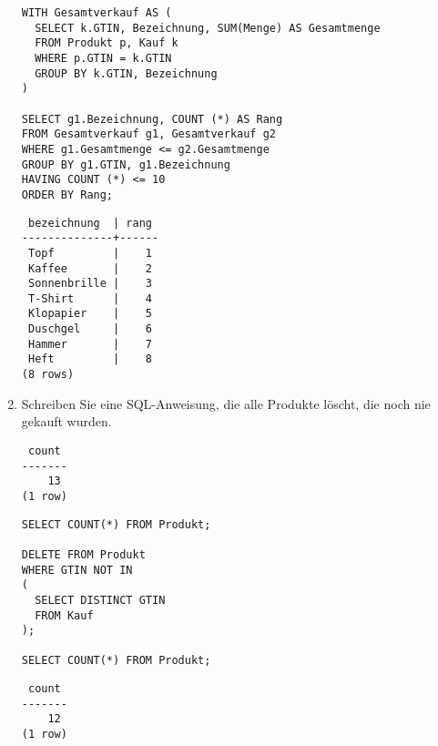 \documentclass{bschlangaul-aufgabe}
\begin{document}
\begin{enumerate}
\begin{bAntwort}
\begin{verbatim}
WITH Gesamtverkauf AS (
  SELECT k.GTIN, Bezeichnung, SUM(Menge) AS Gesamtmenge
  FROM Produkt p, Kauf k
  WHERE p.GTIN = k.GTIN
  GROUP BY k.GTIN, Bezeichnung
)

SELECT g1.Bezeichnung, COUNT (*) AS Rang
FROM Gesamtverkauf g1, Gesamtverkauf g2
WHERE g1.Gesamtmenge <= g2.Gesamtmenge
GROUP BY g1.GTIN, g1.Bezeichnung
HAVING COUNT (*) <= 10
ORDER BY Rang;
\end{verbatim}

\begin{verbatim}
 bezeichnung  | rang
--------------+------
 Topf         |    1
 Kaffee       |    2
 Sonnenbrille |    3
 T-Shirt      |    4
 Klopapier    |    5
 Duschgel     |    6
 Hammer       |    7
 Heft         |    8
(8 rows)
\end{verbatim}
\end{bAntwort}


\item Schreiben Sie eine SQL-Anweisung, die alle Produkte löscht, die
noch nie gekauft wurden.

\begin{bAntwort}
\begin{verbatim}
 count
-------
    13
(1 row)
\end{verbatim}

\begin{verbatim}
SELECT COUNT(*) FROM Produkt;

DELETE FROM Produkt
WHERE GTIN NOT IN
(
  SELECT DISTINCT GTIN
  FROM Kauf
);

SELECT COUNT(*) FROM Produkt;
\end{verbatim}

\begin{verbatim}
 count
-------
    12
(1 row)
\end{verbatim}
\end{bAntwort}
\end{enumerate}
\end{document}
